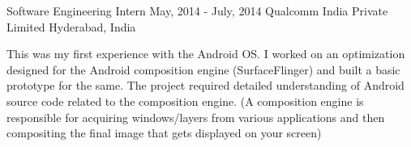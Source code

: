 \begin{cventries}

  \cventry
    {Software Engineering Intern} %
    {May, 2014 - July, 2014} %
    {Qualcomm India Private Limited} %
    {Hyderabad, India} %
    {
      \begin{cvitems} %
        \item {This was my first experience with the Android OS. I worked on an optimization designed for the Android composition engine (SurfaceFlinger) and built a basic prototype for the same. The project required detailed understanding of Android source code related to the composition engine. (A composition engine is responsible for acquiring windows/layers from various applications and then compositing the final image that gets displayed on your screen)}
      \end{cvitems}
    }
  
\end{cventries}


